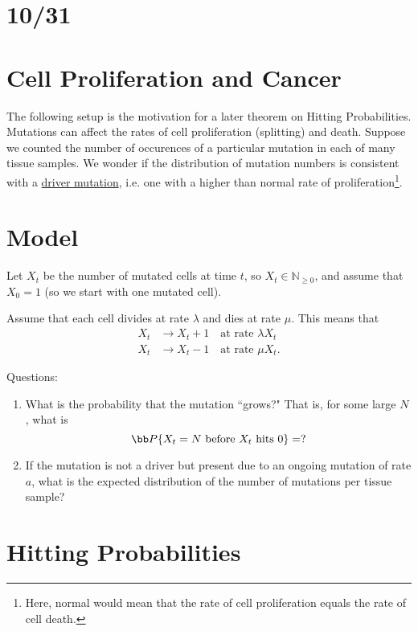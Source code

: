 \documentclass[../../../Master/AppliedStochastics.tex]{subfiles}
\author{Andrew}
\date{31 October 2018}
\begin{document}
%


\makelecture


\section*{10/31}


\section*{Cell Proliferation and Cancer}


The following setup is the motivation for a later theorem on Hitting 
Probabilities. Mutations can affect the rates of cell proliferation (splitting) 
and death. Suppose we counted the number of occurences of a particular mutation 
in each of many tissue samples. We wonder if the distribution of mutation 
numbers is consistent with a \underline{driver mutation}, i.e. one with a 
higher than normal rate of proliferation\footnote{Here, normal would mean that 
the rate of cell proliferation equals the rate of cell death.}.


\section*{Model}


Let $X_t$ be the number of mutated cells at time $t$, so $X_t \in 
\mathbb{N}_{\geq 0}$, and assume that $X_0 =1$ (so we start with one mutated 
cell). 

Assume that each cell divides at rate $\lambda$ and dies at rate $\mu$. This 
means that
\begin{align*}
	X_t &\to X_t + 1 \quad \text{at rate $\lambda X_t$}\\
	X_t & \to X_t - 1 \quad \text{at rate $\mu X_t$}.
\end{align*}

Questions:
\begin{enumerate}
	\item What is the probability that the mutation ``grows?" That is, for some 
	large $N$, what is 
	\[
		\bb P\{X_t = N \text{ before } X_t \text{ hits } 0 \}= ?
	\]
	\item If the mutation is not a driver but present due to an ongoing 
	mutation of rate $a$, what is the expected distribution of the number of 
	mutations per tissue sample?
\end{enumerate}


\section*{Hitting Probabilities}
\end{document}
